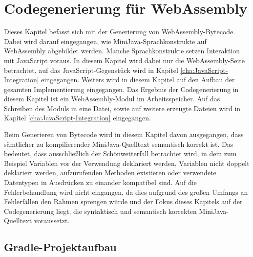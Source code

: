 \chapter{Codegenerierung für WebAssembly}

Dieses Kapitel befasst sich mit der Generierung von WebAssembly-Bytecode. Dabei wird darauf eingegangen, wie MiniJava-Sprachkonstrukte auf WebAssembly abgebildet werden. Manche Sprachkonstrukte setzen Interaktion mit JavaScript voraus. In diesem Kapitel wird dabei nur die WebAssembly-Seite betrachtet, auf das JavaScript-Gegenstück wird in Kapitel \ref{cha:JavaScript-Integration} eingegangen. Weiters wird in diesem Kapitel auf den Aufbau der gesamten Implementierung eingegangen. Das Ergebnis der Codegenerierung in diesem Kapitel ist ein WebAssembly-Modul im Arbeitsspeicher. Auf das Schreiben des Moduls in eine Datei, sowie auf weitere erzeugte Dateien wird in Kapitel \ref{cha:JavaScript-Integration} eingegangen.

Beim Generieren von Bytecode wird in diesem Kapitel davon ausgegangen, dass sämtlicher zu kompilierender MiniJava-Quelltext semantisch korrekt ist. Das bedeutet, dass ausschließlich der Schönwetterfall betrachtet wird, in dem zum Beispiel Variablen vor der Verwendung deklariert werden, Variablen nicht doppelt deklariert werden, aufzurufenden Methoden existieren oder verwendete Datentypen in Ausdrücken zu einander kompatibel sind. Auf die Fehlerbehandlung wird nicht eingangen, da dies aufgrund des großen Umfangs an Fehlerfällen den Rahmen sprengen würde und der Fokus dieses Kapitels auf der Codegenerierung liegt, die syntaktisch und semantisch korrekten MiniJava-Quelltext voraussetzt.

\section{Gradle-Projektaufbau}

